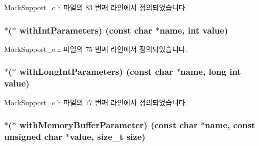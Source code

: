 Mock\+Support\+\_\+c.\+h 파일의 83 번째 라인에서 정의되었습니다.

\subsubsection[{\texorpdfstring{with\+Int\+Parameters}{withIntParameters}}]{$\ast$($\ast$ with\+Int\+Parameters) (const char $\ast$name, int value)}\hypertarget{struct_s_mock_actual_call__c_a43e787362c2505490ba112e29304daca}{}\label{struct_s_mock_actual_call__c_a43e787362c2505490ba112e29304daca}


Mock\+Support\+\_\+c.\+h 파일의 75 번째 라인에서 정의되었습니다.

\subsubsection[{\texorpdfstring{with\+Long\+Int\+Parameters}{withLongIntParameters}}]{$\ast$($\ast$ with\+Long\+Int\+Parameters) (const char $\ast$name, long int value)}\hypertarget{struct_s_mock_actual_call__c_a52a99bbfd66ff9dbfcd7331f2c9adec9}{}\label{struct_s_mock_actual_call__c_a52a99bbfd66ff9dbfcd7331f2c9adec9}


Mock\+Support\+\_\+c.\+h 파일의 77 번째 라인에서 정의되었습니다.

\subsubsection[{\texorpdfstring{with\+Memory\+Buffer\+Parameter}{withMemoryBufferParameter}}]{$\ast$($\ast$ with\+Memory\+Buffer\+Parameter) (const char $\ast$name, const unsigned char $\ast$value, size\+\_\+t {\bf size})}\hypertarget{struct_s_mock_actual_call__c_a8fae6f40dd2bb6dc8a3e3361cca75103}{}\label{struct_s_mock_actual_call__c_a8fae6f40dd2bb6dc8a3e3361cca75103}


